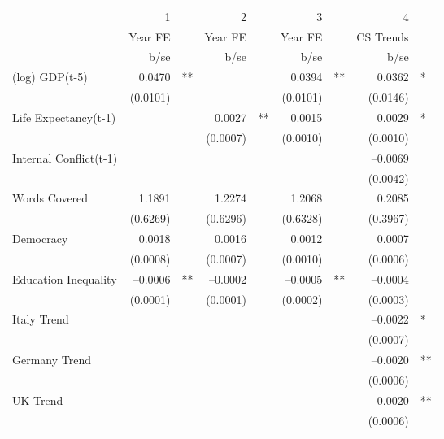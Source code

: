 \begin{tabular} {l* {4}{r @{} l}}
\hline
            &           1&   &           2&   &           3&   &           4&   \\
            &     Year FE&   &     Year FE&   &     Year FE&   &   CS Trends&   \\
            &        b/se&   &        b/se&   &        b/se&   &        b/se&   \\
\hline
(log) GDP(t-5)&      0.0470&** &            &   &      0.0394&** &      0.0362&*  \\
            &    (0.0101)&   &            &   &    (0.0101)&   &    (0.0146)&   \\
Life Expectancy(t-1) &            &   &      0.0027&** &      0.0015&   &      0.0029&*  \\
            &            &   &    (0.0007)&   &    (0.0010)&   &    (0.0010)&   \\
Internal Conflict(t-1)&            &   &            &   &            &   &    --0.0069&   \\
            &            &   &            &   &            &   &    (0.0042)&   \\
Words Covered&      1.1891&   &      1.2274&   &      1.2068&   &      0.2085&   \\
            &    (0.6269)&   &    (0.6296)&   &    (0.6328)&   &    (0.3967)&   \\
Democracy   &      0.0018&   &      0.0016&   &      0.0012&   &      0.0007&   \\
            &    (0.0008)&   &    (0.0007)&   &    (0.0010)&   &    (0.0006)&   \\
Education Inequality&    --0.0006&** &    --0.0002&   &    --0.0005&** &    --0.0004&   \\
            &    (0.0001)&   &    (0.0001)&   &    (0.0002)&   &    (0.0003)&   \\
Italy Trend &            &   &            &   &            &   &    --0.0022&*  \\
            &            &   &            &   &            &   &    (0.0007)&   \\
Germany Trend&            &   &            &   &            &   &    --0.0020&** \\
            &            &   &            &   &            &   &    (0.0006)&   \\
UK Trend    &            &   &            &   &            &   &    --0.0020&** \\
            &            &   &            &   &            &   &    (0.0006)&   \\

\end{tabular}
